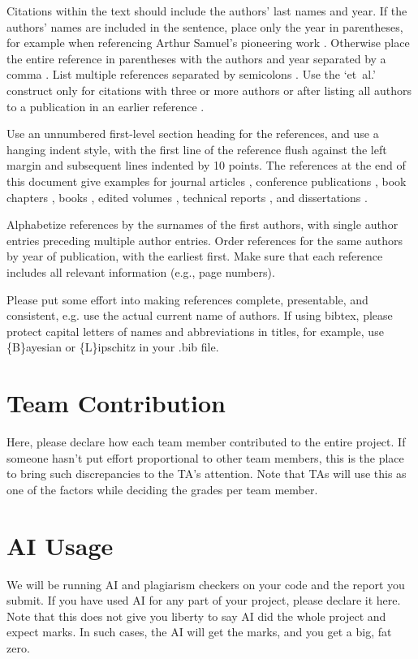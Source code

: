 \documentclass{article}
\theoremstyle{plain}
\theoremstyle{definition}
\theoremstyle{remark}
\begin{document}
Citations within the text should include the authors' last names and year. If
the authors' names are included in the sentence, place only the year in
parentheses, for example when referencing Arthur Samuel's pioneering work
. Otherwise place the entire reference in parentheses with the
authors and year separated by a comma \cite{Samuel59}. List multiple references
separated by semicolons \cite{kearns89,Samuel59,mitchell80}. Use the `et~al.'
construct only for citations with three or more authors or after listing all
authors to a publication in an earlier reference \cite{MachineLearningI}.

Use an unnumbered first-level section heading for the references, and use a
hanging indent style, with the first line of the reference flush against the
left margin and subsequent lines indented by 10 points. The references at the
end of this document give examples for journal articles \cite{Samuel59},
conference publications \cite{langley00}, book chapters \cite{Newell81}, books
\cite{DudaHart2nd}, edited volumes \cite{MachineLearningI}, technical reports
\cite{mitchell80}, and dissertations \cite{kearns89}.

Alphabetize references by the surnames of the first authors, with single author
entries preceding multiple author entries. Order references for the same
authors by year of publication, with the earliest first. Make sure that each
reference includes all relevant information (e.g., page numbers).

Please put some effort into making references complete, presentable, and
consistent, e.g. use the actual current name of authors. If using bibtex,
please protect capital letters of names and abbreviations in titles, for
example, use \{B\}ayesian or \{L\}ipschitz in your .bib file.

\section*{Team Contribution}

Here, please declare how each team member contributed to the entire project. If someone hasn't put effort proportional to other team members, this is the place to bring such discrepancies to the TA's attention. Note that TAs will use this as one of the factors while deciding the grades per team member.   

\section*{AI Usage}
We will be running AI and plagiarism checkers on your code and the report you submit. If you have used AI for any part of your project, please declare it here. Note that this does not give you liberty to say AI did the whole project and expect marks. In such cases, the AI will get the marks, and you get a big, fat zero.   
\end{document}
